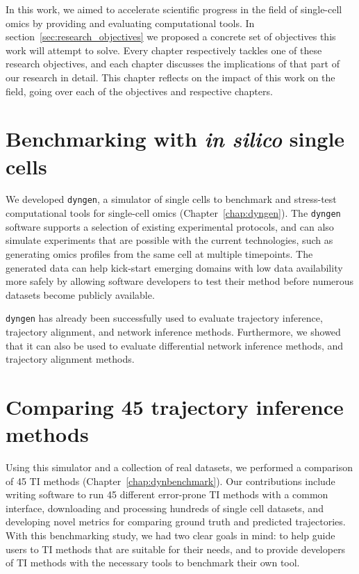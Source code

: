 

In this work, we aimed to accelerate scientific progress in the field of single-cell omics by providing and evaluating computational tools. In section~\ref{sec:research_objectives} we proposed a concrete set of objectives this work will attempt to solve. Every chapter respectively tackles one of these research objectives, and each chapter discusses the implications of that part of our research in detail. This chapter reflects on the impact of this work on the field, going over each of the objectives and respective chapters. 

\section{Benchmarking with \textit{in silico} single cells}

We developed \texttt{dyngen}, a simulator of single cells to benchmark and stress-test computational tools for single-cell omics (Chapter~\ref{chap:dyngen}).
The \texttt{dyngen} software supports a selection of existing experimental protocols, and can also simulate experiments that are possible with the current technologies, such as generating omics profiles from the same cell at multiple timepoints.
The generated data can help kick-start emerging domains with low data availability more safely by allowing software developers to test their method before numerous datasets become publicly available.

\texttt{dyngen} has already been successfully used to evaluate trajectory inference\cite{saelens_comparisonsinglecelltrajectory_2019}, trajectory alignment\cite{vandenberge_trajectorybaseddifferentialexpression_2019}, and network inference\cite{pratapa_benchmarkingalgorithmsgene_2019} methods. Furthermore, we showed that it can also be used to evaluate differential network inference methods, and trajectory alignment methods.




\section{Comparing 45 trajectory inference methods}
Using this simulator and a collection of real datasets, we performed a comparison of 45 TI methods (Chapter~\ref{chap:dynbenchmark}).
Our contributions include writing software to run 45 different error-prone TI methods with a common interface, downloading and processing hundreds of single cell datasets, and developing novel metrics for comparing ground truth and predicted trajectories.
With this benchmarking study, we had two clear goals in mind: to help guide users to TI methods that are suitable for their needs, and to provide developers of TI methods with the necessary tools to benchmark their own tool.

